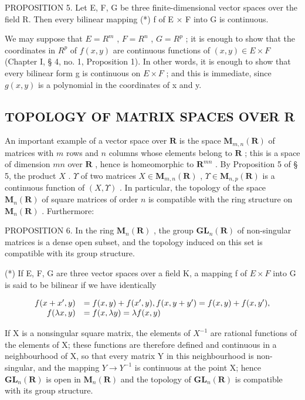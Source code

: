 PROPOSITION 5. Let E, F, G be three finite-dimensional vector spaces over the field R. Then every bilinear mapping (*) f of E × F into G is continuous.

We may suppose that \(E = R^{m}\) , \(F = R^{n}\) , \(G = R^{p}\) ; it is enough to show that the coordinates in \(R^{p}\) of \(f(x, y)\) are continuous functions of \((x, y) \in E \times F\) (Chapter I, § 4, no. 1, Proposition 1). In other words, it is enough to show that every bilinear form g is continuous on \(E \times F\) ; and this is immediate, since \(g(x, y)\) is a polynomial in the coordinates of x and y.

\subsection{TOPOLOGY OF MATRIX SPACES OVER R}

An important example of a vector space over \(\mathbf{R}\) is the space \(\mathbf{M}_{m,n}(\mathbf{R})\) of matrices with \(m\) rows and \(n\) columns whose elements belong to \(\mathbf{R}\) ; this is a space of dimension \(mn\) over \(\mathbf{R}\) , hence is homeomorphic to \(\mathbf{R}^{mn}\) . By Proposition 5 of § 5, the product \(X\) . \(\Upsilon\) of two matrices \(X \in \mathbf{M}_{m,n}(\mathbf{R})\) , \(\Upsilon \in \mathbf{M}_{n,p}(\mathbf{R})\) is a continuous function of \((X, \Upsilon)\) . In particular, the topology of the space \(\mathbf{M}_n(\mathbf{R})\) of square matrices of order \(n\) is compatible with the ring structure on \(\mathbf{M}_n(\mathbf{R})\) . Furthermore:

PROPOSITION 6. In the ring \(\mathbf{M}_n(\mathbf{R})\) , the group \(\mathbf{GL}_n(\mathbf{R})\) of non-singular matrices is a dense open subset, and the topology induced on this set is compatible with its group structure.

(*) If E, F, G are three vector spaces over a field K, a mapping f of \(E \times F\) into G is said to be bilinear if we have identically

\[
\begin{array}{r l} f (x + x ^ {\prime}, y) & = f (x, y) + f (x ^ {\prime}, y), f (x, y + y ^ {\prime}) = f (x, y) + f (x, y ^ {\prime}), \\ f (\lambda x, y) & = f (x, \lambda y) = \lambda f (x, y) \end{array}
\]

If X is a nonsingular square matrix, the elements of \(X^{-1}\) are rational functions of the elements of X; these functions are therefore defined and continuous in a neighbourhood of X, so that every matrix Y in this neighbourhood is non-singular, and the mapping \(Y \to Y^{-1}\) is continuous at the point X; hence \(\mathbf{GL}_{n}(\mathbf{R})\) is open in \(\mathbf{M}_{n}(\mathbf{R})\) and the topology of \(\mathbf{GL}_{n}(\mathbf{R})\) is compatible with its group structure.


